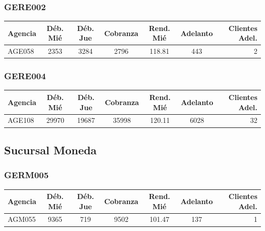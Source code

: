 \documentclass[11pt,a4paper]{article}
\begin{document}
\subsubsection{GERE002}

\begin{center}
\renewcommand{\arraystretch}{1.2}
\footnotesize
\begin{tabular}{lS[table-format=5.0]S[table-format=5.0]S[table-format=5.0]S[table-format=3.2]S[table-format=4.0]r}
\toprule
\textbf{Agencia}
  & {\textbf{D\'eb. Mi\'e}} & {\textbf{D\'eb. Jue}} & {\textbf{Cobranza}}
  & {\textbf{Rend. Mi\'e}} & {\textbf{Adelanto}} & \textbf{Clientes Adel.} \\
\midrule
AGE058 & 2353 & 3284 & 2796 & 118.81 & 443 & 2 \\
\bottomrule
\end{tabular}
\end{center}

\subsubsection{GERE004}

\begin{center}
\renewcommand{\arraystretch}{1.2}
\footnotesize
\begin{tabular}{lS[table-format=5.0]S[table-format=5.0]S[table-format=5.0]S[table-format=3.2]S[table-format=5.0]r}
\toprule
\textbf{Agencia}
  & {\textbf{D\'eb. Mi\'e}} & {\textbf{D\'eb. Jue}} & {\textbf{Cobranza}}
  & {\textbf{Rend. Mi\'e}} & {\textbf{Adelanto}} & \textbf{Clientes Adel.} \\
\midrule
AGE108 & 29970 & 19687 & 35998 & 120.11 & 6028 & 32 \\
\bottomrule
\end{tabular}
\end{center}

\subsection{Sucursal Moneda}

\subsubsection{GERM005}

\begin{center}
\renewcommand{\arraystretch}{1.2}
\footnotesize
\begin{tabular}{lS[table-format=5.0]S[table-format=4.0]S[table-format=5.0]S[table-format=3.2]S[table-format=4.0]r}
\toprule
\textbf{Agencia}
  & {\textbf{D\'eb. Mi\'e}} & {\textbf{D\'eb. Jue}} & {\textbf{Cobranza}}
  & {\textbf{Rend. Mi\'e}} & {\textbf{Adelanto}} & \textbf{Clientes Adel.} \\
\midrule
AGM055 & 9365 & 719 & 9502 & 101.47 & 137 & 1 \\
\bottomrule
\end{tabular}
\end{center}
\end{document}
